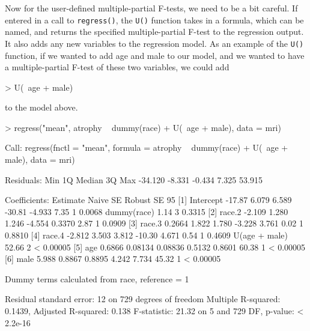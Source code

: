 \documentclass[landscape]{article}
\renewenvironment{Schunk}{\vspace{\topsep}}{\vspace{\topsep}}
\begin{document}
Now for the user-defined multiple-partial F-tests, we need to be a bit careful. If entered in a call to \texttt{regress()}, the \texttt{U()} function takes in a formula, which can be named, and returns the specified multiple-partial F-test to the regression output. It also adds any new variables to the regression model. As an example of the \texttt{U()} function, if we wanted to add age and male to our model, and we wanted to have a multiple-partial F-test of these two variables, we could add
\begin{Schunk}
\begin{Sinput}
> U(~age + male)
\end{Sinput}
\end{Schunk}
to the model above. 
\begin{Schunk}
\begin{Sinput}
> regress("mean", atrophy ~ dummy(race) + U(~age + male), data = mri)
\end{Sinput}
\begin{Soutput}
Call:
regress(fnctl = "mean", formula = atrophy ~ dummy(race) + U(~age + 
    male), data = mri)

Residuals:
    Min      1Q  Median      3Q     Max 
-34.120  -8.331  -0.434   7.325  53.915 

Coefficients:
                     Estimate  Naive SE  Robust SE    95%
[1] Intercept         -17.87     6.079     6.589       -30.81    -4.933           7.35 1    0.0068 
    dummy(race)                                                                   1.14 3    0.3315 
[2]    race.2         -2.109     1.280     1.246       -4.554     0.3370          2.87 1    0.0909 
[3]    race.3          0.2664    1.822     1.780       -3.228     3.761           0.02 1    0.8810 
[4]    race.4         -2.812     3.503     3.812       -10.30     4.671           0.54 1    0.4609 
    U(age + male)                                                                52.66 2  < 0.00005
[5]   age              0.6866   0.08134   0.08836       0.5132    0.8601         60.38 1  < 0.00005
[6]   male             5.988     0.8867    0.8895       4.242     7.734          45.32 1  < 0.00005

 Dummy terms calculated from race, reference = 1 

Residual standard error: 12 on 729 degrees of freedom
Multiple R-squared:  0.1439,	Adjusted R-squared:  0.138 
F-statistic: 21.32 on 5 and 729 DF,  p-value: < 2.2e-16
\end{Soutput}
\end{Schunk}
\end{document}
